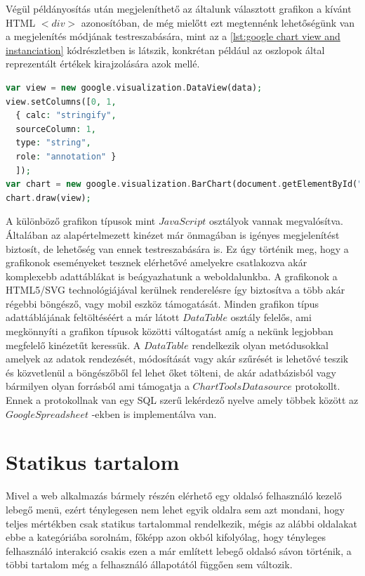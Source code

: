 \documentclass[12pt]{report}
\theoremstyle{definition}
\begin{document}
	Végül példányosítás után megjeleníthető az általunk választott grafikon a kívánt HTML $<div>$ azonosítóban, de még mielőtt ezt megtennénk lehetőségünk van a megjelenítés módjának testreszabására, mint az a \ref{lst:google chart view and instanciation} kódrészletben is látszik, konkrétan például az oszlopok által reprezentált értékek kirajzolására azok mellé. 
	
	\noindent\begin{minipage}{\linewidth}
		\begin{lstlisting}[language=php,label={lst:google chart view and instanciation}, caption={Google Charts megjelenítésének beállítása és a példányosított objektum beszúrása a megfelelő $<div>$-be}]
var view = new google.visualization.DataView(data);
view.setColumns([0, 1,
  { calc: "stringify",
  sourceColumn: 1,
  type: "string",
  role: "annotation" }
  ]);
var chart = new google.visualization.BarChart(document.getElementById("graph"));
chart.draw(view);
		\end{lstlisting}
	\end{minipage}
	
	A különböző grafikon típusok mint $JavaScript$ osztályok vannak megvalósítva. Általában az alapértelmezett kinézet már önmagában is igényes megjelenítést biztosít, de lehetőség van ennek testreszabására is. Ez úgy történik meg, hogy a grafikonok eseményeket tesznek elérhetővé amelyekre csatlakozva akár komplexebb adattáblákat is beágyazhatunk a weboldalunkba. A grafikonok a HTML5/SVG technológiájával kerülnek renderelésre így biztosítva a több akár régebbi böngésző, vagy mobil eszköz támogatását. Minden grafikon típus adattáblájának feltöltéséért a már látott $DataTable$ osztály felelős, ami megkönnyíti a grafikon típusok közötti váltogatást amíg a nekünk legjobban megfelelő kinézetűt keressük. A $DataTable$ rendelkezik olyan metódusokkal amelyek az adatok rendezését, módosítását vagy akár szűrését is lehetővé teszik és közvetlenül a böngészőből fel lehet őket tölteni, de akár adatbázisból vagy bármilyen olyan forrásból ami támogatja a $Chart Tools Datasource$ protokollt. Ennek a protokollnak van egy SQL szerű lekérdező nyelve amely többek között az $Google Spreadsheet$ -ekben is implementálva van.
	
	\section{Statikus tartalom}
	
	Mivel a web alkalmazás bármely részén elérhető egy oldalsó felhasználó kezelő lebegő menü, ezért ténylegesen nem lehet egyik oldalra sem azt mondani, hogy teljes mértékben csak statikus tartalommal rendelkezik, mégis az alábbi oldalakat ebbe a kategóriába sorolnám, főképp azon okból kifolyólag, hogy tényleges felhasználó interakció csakis ezen a már említett lebegő oldalsó  sávon történik, a többi tartalom még a felhasználó állapotától függően sem változik.
	
\end{document}
